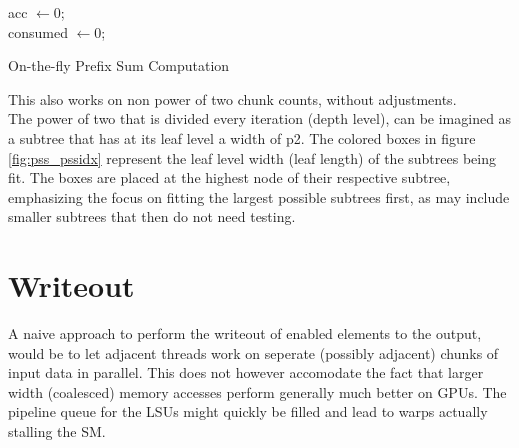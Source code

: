 \documentclass{tudscrreprt}
\begin{document}
				\begin{algorithm}[!ht]
					\SetAlgoLined
					acc $\gets 0$; \\
					consumed $\gets 0$; \\
					\caption{\label{alg:pssidx}On-the-fly Prefix Sum Computation}
				\end{algorithm}
			
				This also works on non power of two chunk counts, without adjustments. \\
				The power of two that is divided every iteration (depth level), can be imagined as a subtree that has at its leaf level a width of p2. The colored boxes in figure \ref{fig:pss_pssidx} represent the leaf level width (leaf length) of the subtrees being fit. The boxes are placed at the highest node of their respective subtree, emphasizing the focus on fitting the largest possible subtrees first, as may include smaller subtrees that then do not need testing. \\
			
		\section{Writeout}
			\label{sec:analysis_writeout}
			A naive approach to perform the writeout of enabled elements to the output, would be to let adjacent threads work on seperate (possibly adjacent) chunks of input data in parallel. This does not however accomodate the fact that larger width (coalesced) memory accesses perform generally much better on GPUs. The pipeline queue for the LSUs might quickly be filled and lead to warps actually stalling the SM. \\
			
\end{document}
